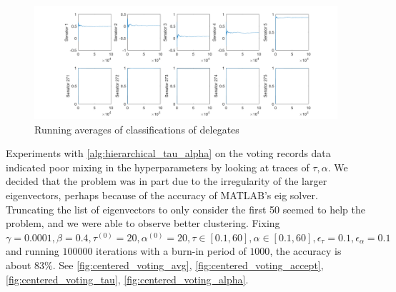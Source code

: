 \documentclass{siamart1116}
\begin{document}
    \begin{figure}[!htb]
    \caption{\label{fig:mcmc_gamma_senators} Running averages of classifications of delegates}
    \centering
    \includegraphics[width=\linewidth]{voting/mcmc_gamma/senator_avgs.png}
    \end{figure}
    Experiments with \cref{alg:hierarchical_tau_alpha} on the voting records data indicated poor mixing in the hyperparameters by looking at traces of $\tau, \alpha$. We decided that the problem was in part due to the irregularity of the larger eigenvectors, perhaps because of the accuracy of MATLAB's eig solver. Truncating the list of eigenvectors to only consider the first 50 seemed to help the problem, and we were able to observe better clustering. Fixing $\gamma = 0.0001, \beta = 0.4, \tau^{(0)}=20,\alpha^{(0)}=20,\tau\in[0.1,60],\alpha\in[0.1,60],\epsilon_\tau=0.1,\epsilon_\alpha=0.1$ and running $100000$ iterations with a burn-in period of $1000$, the accuracy is about 83\%. See \cref{fig:centered_voting_avg}, \cref{fig:centered_voting_accept}, \cref{fig:centered_voting_tau}, \cref{fig:centered_voting_alpha}.
\end{document}
